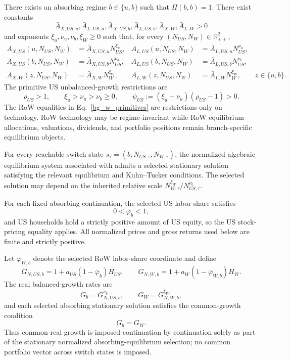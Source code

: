 \documentclass{article}
\def\green#1{#1}%
\begin{document}
\begin{ass}\label{ass_absorbing_bg_technology_primitives}
There exists an absorbing regime $b\in\{u,b\}$ such that $\Pi(b,b)=1$. There exist constants
\[
\bar A_{X,US,u},\bar A_{L,US,u},\bar A_{X,US,b},\bar A_{L,US,b},\bar A_{X,W},\bar A_{L,W}>0
\]
and exponents $\xi_u,\nu_u,\nu_b,\xi_W\ge0$ such that, for every $(N_{US},N_W)\in\mathbb R_{++}^2$,
\begin{align}
A_{X,US}(u,N_{US},N_W)&=\bar A_{X,US,u}N_{US}^{\xi_u},
&
A_{L,US}(u,N_{US},N_W)&=\bar A_{L,US,u}N_{US}^{\nu_u},
\label{US_u_productivity_primitives}\\
A_{X,US}(b,N_{US},N_W)&=\bar A_{X,US,b}N_{US}^{\nu_b},
&
A_{L,US}(b,N_{US},N_W)&=\bar A_{L,US,b}N_{US}^{\nu_b},
\label{bg_us_primitives}\\
A_{X,W}(z,N_{US},N_W)&=\bar A_{X,W}N_W^{\xi_W},
&
A_{L,W}(z,N_{US},N_W)&=\bar A_{L,W}N_W^{\xi_W},
\qquad z\in\{u,b\}.
\label{bg_w_primitives}
\end{align}
The primitive US unbalanced-growth restrictions are
\begin{equation}\label{psi_US_def}
\rho_{US}>1,
\qquad
\xi_u>\nu_u>\nu_b\ge0,
\qquad
\psi_{US}:=(\xi_u-\nu_u)(\rho_{US}-1)>0.
\end{equation}
The RoW equalities in Eq.~\eqref{bg_w_primitives} are restrictions only on technology. RoW technology may be regime-invariant while RoW equilibrium allocations, valuations, dividends, and portfolio positions remain branch-specific equilibrium objects.
\end{ass}

\begin{ass}
\label{ass_absorbing_stationary_equilibrium_selection}
For every reachable switch state $s_\tau=(b,N_{US,\tau},N_{W,\tau})$, the normalized algebraic equilibrium system associated with  admits a selected stationary solution \green{satisfying the relevant equilibrium and Kuhn--Tucker conditions}.  The selected solution may depend on the inherited relative scale $N_{W,\tau}^{\xi_W}/N_{US,\tau}^{\nu_b}$.

For \green{each} fixed absorbing continuation, \green{the selected US labor share satisfies}
\[
\green{0<}\bar\varphi_b\green{<1},
\]
and \green{US households hold a strictly positive amount of US equity}, \green{so the} US \green{stock-pricing equality applies}.  \green{All normalized prices and gross returns used below are finite and strictly positive}.

Let $\green{\bar\varphi}_{W,b}$ \green{denote the selected RoW labor-share coordinate and define}
\[
G_{N,US,b}
=
1+a_{US}(1-\bar\varphi_b)H_{US},
\qquad
G_{N,W,b}
=
1+a_W(1-\bar\varphi_{W,b})H_W.
\]
The real balanced-growth rates are
\[
G_b=G_{N,US,b}^{\nu_b},
\qquad
G_W=G_{N,W,b}^{\xi_W},
\]
and each selected absorbing stationary solution satisfies the common-growth condition
\[
G_b=G_W.
\]
Thus common \green{real} growth is imposed continuation by continuation \green{solely as part of the stationary normalized absorbing-equilibrium selection}; \green{no} common portfolio vector across switch states is \green{imposed}.
\end{ass}
\end{document}
